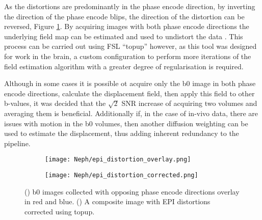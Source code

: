 As the distortions are predominantly in the phase encode direction, by inverting the direction of the phase encode blips, the direction of the distortion can be reversed, Figure \ref{fig:ex_epi_distortion_overlay}. By acquiring images with both phase encode directions the underlying field map can be estimated and used to undistort the data \cite{andersson_how_2003}. This process can be carried out using \ac{FSL} ``topup'' however, as this tool was designed for work in the brain, a custom configuration to perform more iterations of the field estimation algorithm with a greater degree of regularisation is required. 

Although in some cases it is possible ot acquire only the b0 image in both phase encode directions, calculate the displacement field, then apply this field to other b-values, it was decided that the $\sqrt{2}$ \ac{SNR} increase of acquiring two volumes and averaging them is beneficial. Additionally if, in the case of in-vivo data, there are issues with motion in the b0 volumes, then another diffusion weighting can be used to estimate the displacement, thus adding inherent redundancy to the pipeline.

\begin{figure}[H]
	\centering
	\begin{subfigure}[c]{0.47\textwidth}
		\centering
		\texttt{[image: Neph/epi\_distortion\_overlay.png]}
		\caption{}
		\label{fig:ex_epi_distortion_overlay}
	\end{subfigure}
	\hfill
	\begin{subfigure}[c]{0.47\textwidth}
		\centering
		\texttt{[image: Neph/epi\_distortion\_corrected.png]}
		\caption{}
		\label{fig:ex_epi_distortion_corrected}
	\end{subfigure}
	\caption{() b0 images collected with opposing phase encode directions overlay in red and blue. () A composite image with \ac{EPI} distortions corrected using topup.}
	\label{fig:ex_epi_distortion}
\end{figure}

